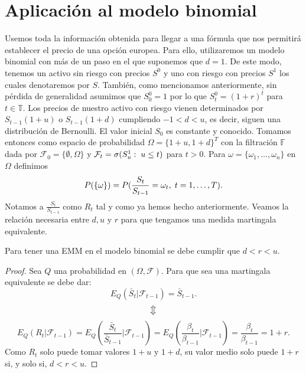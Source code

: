 \section{Aplicación al modelo binomial}
Usemos toda la información obtenida para llegar a una fórmula que nos permitirá establecer el precio de una opción europea. Para ello, utilizaremos un modelo binomial con más de un paso en el que suponemos que $ d = 1 $. De este modo, tenemos un activo sin riesgo con precios $ S^0 $ y uno con riesgo con precios $ S^1$ los cuales denotaremos por $ S $. También, como mencionamos anteriormente, sin pérdida de generalidad asumimos que $ S^0_0  = 1$ por lo que $ S_t^0 =  (1+r)^t $ para $ t \in \mathbb{T} $. Los precios de nuestro activo con riesgo vienen determinados por $ S_{t-1}(1+u) $ o $ S_{t-1}(1+d) $ cumpliendo $ -1 < d < u $, es decir, siguen una distribución de Bernoulli. El valor inicial $ S_0 $ es constante y conocido. Tomamos entonces como espacio de probabilidad $ \Omega = \{1+u,1+d\}^T $ con la filtración $ \mathbb{F} $ dada por $ \mathcal{F}_0 = \{\emptyset, \Omega\} $ y $ \mathcal{F}_t = \sigma(S_u^1: \hspace{1mm} u \leq t) $ para $ t >0 $. Para $ \omega = \{\omega_1,\dots,\omega_n\} $ en $ \Omega $ definimos
\[
P(\{\omega\}) = P(\frac{S_t}{S_{t-1}} = \omega_t, \hspace{1mm} t=1,\dots,T).
\]
Notamos a $ \frac{S_t}{S_{t-1}} $ como $ R_t $ tal y como ya hemos hecho anteriormente. Veamos la relación necesaria entre $ d,u \text{ y } r$ para que tengamos una medida martingala equivalente.
\bigskip
\begin{lemaBox}\label{cotasUpDown}
	Para tener una EMM en el modelo binomial se debe cumplir que $ d < r < u $.
\end{lemaBox}
\begin{proof}
	Sea $ Q $ una probabilidad en $ (\Omega, \mathcal{F}) $. Para que sea una martingala equivalente se debe dar:
	\[
	E_Q(\bar{S}_t | \mathcal{F}_{t-1}) = \bar{S}_{t-1}.
	\]
	\[
	\big\Updownarrow
	\]
	\[
	E_Q(R_t | \mathcal{F}_{t-1} ) = E_Q(\frac{\bar{S}_t}{\bar{S}_{t-1}} | \mathcal{F}_{t-1}) = E_Q(\frac{\beta_t}{\beta_{t-1}} | \mathcal{F}_{t-1}) = \frac{\beta_t}{\beta_{t-1}} = 1+r.
	\]
	Como $ R_t $ solo puede tomar valores $ 1+u $ y $ 1+d $, su valor medio solo puede $ 1+r $ si, y solo si, $ d < r < u $.
\end{proof}
\bigskip

